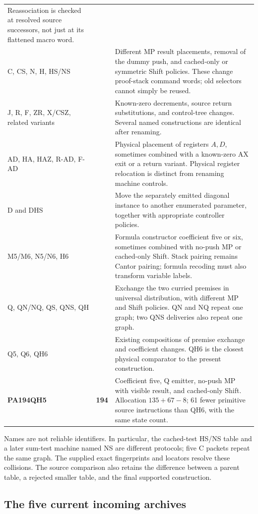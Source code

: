 \documentclass[11pt,letterpaper]{article}
\begin{document}
\begin{longtable}{@{}>{\raggedright\arraybackslash}p{}>{\raggedright\arraybackslash}p{}>{\raggedright\arraybackslash}p{}@{}}
 Reassociation is checked at resolved source successors, not just at its
 flattened macro word.\\
C, CS, N, H, HS/NS & 194 & Different MP result placements, removal of the dummy
 push, and cached-only or symmetric Shift policies. These change proof-stack
 command words; old selectors cannot simply be reused.\\
J, R, F, ZR, X/CSZ, related variants & 194 & Known-zero decrements, source return
 substitutions, and control-tree changes. Several named constructions are
 identical after renaming.\\
AD, HA, HAZ, R-AD, F-AD & 194 & Physical placement of registers $A,D$, sometimes
 combined with a known-zero AX exit or a return variant. Physical register
 relocation is distinct from renaming machine controls.\\
D and DHS & 194 & Move the separately emitted diagonal instance to another
 enumerated parameter, together with appropriate controller policies.\\
M5/M6, N5/N6, H6 & 194 & Formula constructor coefficient five or six, sometimes
 combined with no-push MP or cached-only Shift. Stack pairing remains Cantor
 pairing; formula recoding must also transform variable labels.\\
Q, QN/NQ, QS, QNS, QH & 194 & Exchange the two curried premises in universal
 distribution, with different MP and Shift policies. QN and NQ repeat one
 graph; two QNS deliveries also repeat one graph.\\
Q5, Q6, QH6 & 194 & Existing compositions of premise exchange and coefficient
 changes. QH6 is the closest physical comparator to the present construction.\\
\textbf{PA194QH5} & \textbf{194} & Coefficient five, Q emitter, no-push MP with
 visible result, and cached-only Shift. Allocation $135+67-8$; 61 fewer
 primitive source instructions than QH6, with the same state count.\\
\bottomrule
\end{longtable}

Names are not reliable identifiers. In particular, the cached-test
HS/NS table and a later sum-test machine named NS are different protocols;
five C packets repeat the same graph. The supplied exact fingerprints and
locators resolve these collisions. The source comparison also retains
the difference between a parent table, a rejected smaller table, and
the final supported construction.

\subsection{The five current incoming archives}
\end{document}
